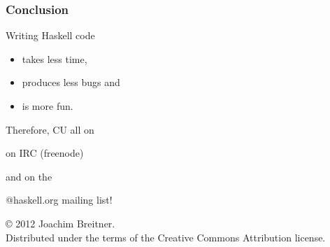 \documentclass{beamer}
\begin{document}
\begin{frame}
\frametitle{Conclusion}
\begin{block}{Writing Haskell code}
\begin{itemize}
\item takes less time,
\item produces less bugs and
\item is more fun.
\end{itemize}
\end{block}
\vfill
Therefore, CU all on 
\begin{center}
 on IRC (freenode)
\end{center}
and on the 
\begin{center}
@haskell.org mailing list!
\end{center}
\end{frame}

\begin{frame}%
%
\strut
\color{white}
\vfill
\small{© 2012 Joachim Breitner.\\
Distributed under the terms of the Creative Commons Attribution license.}
\end{frame}
\end{document}
